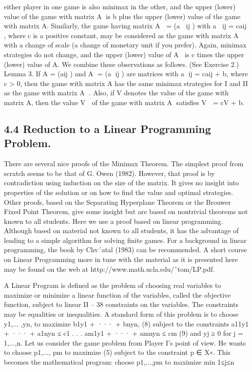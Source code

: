 either player in one game is also minimax in the other, and the upper (lower) value of the
game with matrix A is b plus the upper (lower) value of the game with matrix A.
Similarly, the game having matrix A = (a
ij ) with a
ij = caij , where c is a positive
constant, may be considered as the game with matrix A with a change of scale (a change
of monetary unit if you prefer). Again, minimax strategies do not change, and the upper
(lower) value of A is c times the upper (lower) value of A. We combine these observations
as follows. (See Exercise 2.)
Lemma 3. If A = (aij ) and A = (a
ij ) are matrices with a
ij = caij + b, where c > 0,
then the game with matrix A has the same minimax strategies for I and II as the game
with matrix A
. Also, if V denotes the value of the game with matrix A, then the value
V  of the game with matrix A satisfies V  = cV + b.

\subsection{4.4 Reduction to a Linear Programming Problem.} There are several nice proofs
of the Minimax Theorem. The simplest proof from scratch seems to be that of G. Owen
(1982). However, that proof is by contradiction using induction on the size of the matrix.
It gives no insight into properties of the solution or on how to find the value and optimal
strategies. Other proofs, based on the Separating Hyperplane Theorem or the Brouwer
Fixed Point Theorem, give some insight but are based on nontrivial theorems not known
to all students.
Here we use a proof based on linear programming. Although based on material not
known to all students, it has the advantage of leading to a simple algorithm for solving
finite games. For a background in linear programming, the book by Chv´atal (1983) can be
recommended. A short course on Linear Programming more in tune with the material as
it is presented here may be found on the web at http://www.math.ucla.edu/˜tom/LP.pdf.

A Linear Program is defined as the problem of choosing real variables to maximize or
minimize a linear function of the variables, called the objective function, subject to linear
II – 38
constraints on the variables. The constraints may be equalities or inequalities. A standard
form of this problem is to choose y1,... ,yn, to
maximize b1y1 + ··· + bnyn, (8)
subject to the constraints
a11y1 + ··· + a1nyn ≤ c1
.
.
.
am1y1 + ··· + amnyn ≤ cm
(9)
and
yj ≥ 0 for j = 1,...,n.
Let us consider the game problem from Player I’s point of view. He wants to choose
p1,..., pm to maximize (5) subject to the constraint p ∈ X∗. This becomes the mathematical
program: choose p1,...,pm to
maximize min
1≤j≤n

